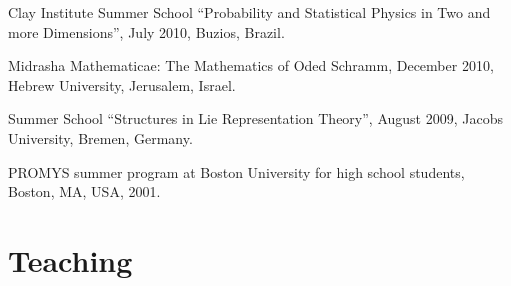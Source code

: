 \documentclass[letterpaper,11pt]{article}
\begin{document}
\begin{etaremune}
\item Clay Institute Summer School ``Probability and Statistical Physics in Two and more Dimensions'', July 2010, Buzios, Brazil. 

\item Midrasha Mathematicae: The Mathematics of Oded Schramm, December 2010, Hebrew University, Jerusalem, Israel. 

\item Summer School ``Structures in Lie Representation Theory'', August 2009, Jacobs University, Bremen, Germany. 

\item PROMYS summer program at Boston University for high school students, Boston, MA, USA, 2001.
\end{etaremune}

\section*{Teaching}
\end{document}
